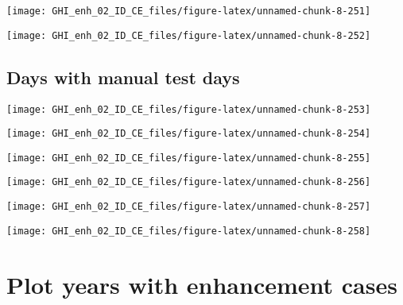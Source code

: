 \documentclass[
  10pt,
  a4paper,oneside]{article}
\begin{document}
\begin{center}\texttt{[image: GHI\_enh\_02\_ID\_CE\_files/figure-latex/unnamed-chunk-8-251]} \end{center}

\begin{center}\texttt{[image: GHI\_enh\_02\_ID\_CE\_files/figure-latex/unnamed-chunk-8-252]} \end{center}

\FloatBarrier

\hypertarget{days-with-manual-test-days}{%
\subsection{Days with manual test days}\label{days-with-manual-test-days}}

\begin{center}\texttt{[image: GHI\_enh\_02\_ID\_CE\_files/figure-latex/unnamed-chunk-8-253]} \end{center}

\begin{center}\texttt{[image: GHI\_enh\_02\_ID\_CE\_files/figure-latex/unnamed-chunk-8-254]} \end{center}

\begin{center}\texttt{[image: GHI\_enh\_02\_ID\_CE\_files/figure-latex/unnamed-chunk-8-255]} \end{center}

\begin{center}\texttt{[image: GHI\_enh\_02\_ID\_CE\_files/figure-latex/unnamed-chunk-8-256]} \end{center}

\begin{center}\texttt{[image: GHI\_enh\_02\_ID\_CE\_files/figure-latex/unnamed-chunk-8-257]} \end{center}

\begin{center}\texttt{[image: GHI\_enh\_02\_ID\_CE\_files/figure-latex/unnamed-chunk-8-258]} \end{center}

\newpage
\FloatBarrier

\hypertarget{plot-years-with-enhancement-cases}{%
\section{Plot years with enhancement cases}\label{plot-years-with-enhancement-cases}}
\end{document}
